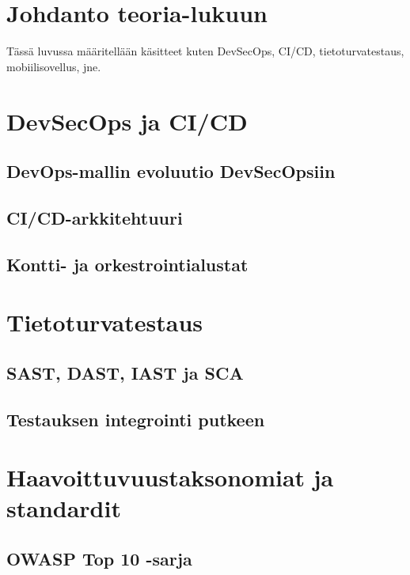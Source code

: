 \documentclass[bscthesis,finnish,oneside,biblatex]{uefcsthesis}
\begin{document}
\section{Johdanto teoria-lukuun}
\label{sec:teoria-johdanto}

Tässä luvussa määritellään käsitteet kuten DevSecOps, CI/CD, tietoturvatestaus, mobiilisovellus, jne.


\section{DevSecOps ja CI/CD}
\label{sec:devsecops-cicd}
  \subsection{DevOps-mallin evoluutio DevSecOpsiin}
  \subsection{CI/CD-arkkitehtuuri}
  \subsection{Kontti- ja orkestrointialustat}

\section{Tietoturvatestaus}
\label{sec:testing}
  \subsection{SAST, DAST, IAST ja SCA}
  \subsection{Testauksen integrointi putkeen}

\section{Haavoittuvuustaksonomiat ja standardit}
\label{sec:taxonomies}

  \subsection{OWASP Top 10 -sarja}
\end{document}
